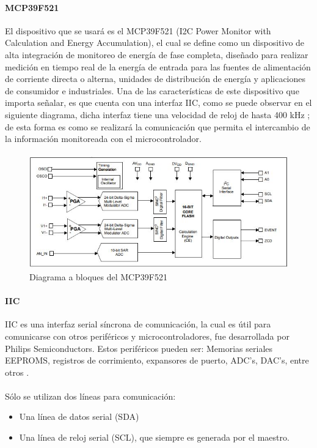 \paragraph{MCP39F521}
El dispositivo que se usará es el MCP39F521 (I2C Power Monitor with Calculation and Energy Accumulation), el cual se define como un dispositivo de alta integración de monitoreo de energía de fase completa, diseñado para realizar medición en tiempo real de la energía de entrada para las fuentes de alimentación de corriente directa o alterna, unidades de distribución de energía y aplicaciones de consumidor e industriales. Una de las características de este dispositivo que importa señalar, es que cuenta con una interfaz IIC, como se puede observar en el siguiente diagrama, dicha interfaz tiene una velocidad de reloj de hasta 400 kHz \citep{MarcoTeorico13}; de esta forma es como se realizará la comunicación que permita el intercambio de la información monitoreada con el microcontrolador. 
\paragraph{}
\begin{figure}[H]
	\centering
	\includegraphics[scale=.9]{Capitulo2/images/DiagramaDispMonitoreo.JPG}
	\caption{Diagrama a bloques del MCP39F521}
	\label{fig:}
\end{figure}

\paragraph{IIC}
IIC es una interfaz serial síncrona de comunicación, la cual es útil para comunicarse  con otros periféricos y microcontroladores, fue desarrollada por Philips Semiconductors.
Estos periféricos pueden ser: Memorias seriales EEPROMS, registros de corrimiento, expansores de puerto, ADC's, DAC's, entre otros \citep{MarcoTeorico17}.
\paragraph{}
Sólo se utilizan dos líneas para comunicación:
\begin{itemize}
	\item Una línea de datos serial (SDA)
    \item Una línea de reloj serial (SCL), que siempre es generada por el maestro.
\end{itemize}

